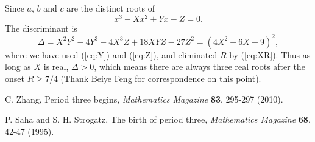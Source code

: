 \documentclass[twocolumn,prl]{revtex4-1}
\begin{document}
Since $a$, $b$ and $c$ are the distinct roots of
\[
  x^3 - X x^2 + Y x - Z = 0.
\]
The discriminant is
\[
\Delta = X^2 Y^2 - 4 Y^3 - 4 X^3 Z + 18 X Y Z - 27 Z^2
  = (4X^2 - 6X + 9)^2,
\]
where we have used (\ref{eq:Y}) and (\ref{eq:Z}),
and eliminated $R$ by (\ref{eq:XR}).
Thus as long as $X$ is real, $\Delta > 0$, which means there are always three
real roots after the onset $R \ge 7/4$
(Thank Beiye Feng for correspondence on this point).

\begin{thebibliography}{}
 C. Zhang,
  Period three begins,
  \textit{Mathematics Magazine}
  \textbf{83},
  295-297
  (2010).

 P. Saha and S. H. Strogatz,
  The birth of period three,
  \textit{Mathematics Magazine}
  \textbf{68},
  42-47
  (1995).


\end{thebibliography}
\end{document}
